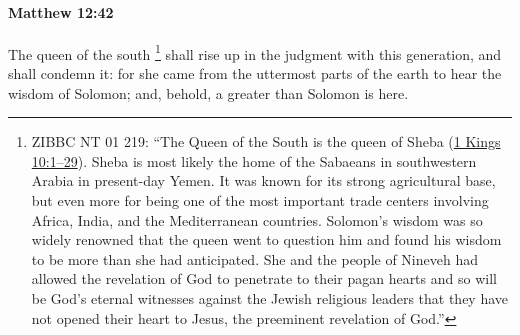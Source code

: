 		\paragraph{Matthew 12:42} %
			\label{MATTHEW-12-42}

			The queen of the south%
				\footnote{%
					ZIBBC NT 01 219: ``The Queen of the South is the queen of Sheba (\hyperref[1KINGS-10-1]{1 Kings 10:1--29}). Sheba is most likely the home of the Sabaeans in southwestern Arabia in present-day Yemen. It was known for its strong agricultural base, but even more for being one of the most important trade centers involving Africa, India, and the Mediterranean countries. Solomon's wisdom was so widely renowned that the queen went to question him and found his wisdom to be more than she had anticipated. She and the people of Nineveh had allowed the revelation of God to penetrate to their pagan hearts and so will be God's eternal witnesses against the Jewish religious leaders that they have not opened their heart to Jesus, the preeminent revelation of God.''
					}
			shall rise up in the judgment with this generation, and shall condemn it: for she came from the uttermost parts of the earth to hear the wisdom of Solomon; and, behold, a greater than Solomon is here.

			\begin{framed}
			\scriptsize
				\begin{compactdesc}
					\item[SBLG] 
				\end{compactdesc}
			\end{framed}

